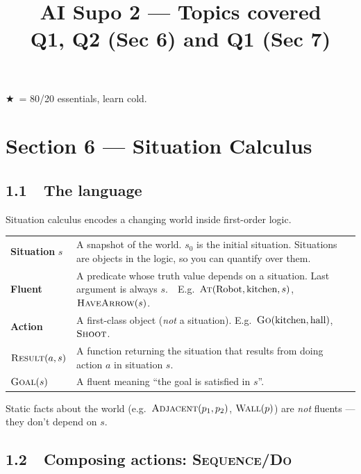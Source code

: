 \documentclass[11pt,a4paper]{article}
\title{\vspace{-1.5cm}AI Supo 2 --- Topics covered\\\large Q1, Q2 (Sec 6) and Q1 (Sec 7)}
\author{}
\date{}
\newcommand{\pred}[1]{\textsc{#1}}
\newcommand{\Result}{\pred{Result}}
\newcommand{\key}{\textbf{\textcolor{keyrule}{\large$\bigstar$}}\ }
\begin{document}
\maketitle
\vspace{-1cm}

\hfill \textbf{\textcolor{keyrule}{$\bigstar$}}\ = 80/20 essentials, learn cold.

\hrulefill

\section*{Section 6 --- Situation Calculus}

\subsection*{1.1\ \ The language}

Situation calculus encodes a changing world inside first-order logic.

\begin{keybox}[\key Core ontology]
\begin{tabular}{@{}p{3.3cm}p{12cm}@{}}
\textbf{Situation} $s$ & A snapshot of the world. $s_0$ is the initial situation. Situations are objects in the logic, so you can quantify over them.\\
\textbf{Fluent} & A predicate whose truth value depends on a situation. Last argument is always $s$.\ \ E.g.\ $\pred{At}(\text{Robot}, \text{kitchen}, s)$, $\pred{HaveArrow}(s)$.\\
\textbf{Action} & A first-class object (\emph{not} a situation). E.g.\ $\pred{Go}(\text{kitchen}, \text{hall})$, $\pred{Shoot}$.\\
\textbf{$\Result(a,s)$} & A function returning the situation that results from doing action $a$ in situation $s$.\\
\textbf{$\pred{Goal}(s)$} & A fluent meaning ``the goal is satisfied in $s$''.\\
\end{tabular}
\end{keybox}

Static facts about the world (e.g.\ $\pred{Adjacent}(p_1,p_2)$, $\pred{Wall}(p)$) are \emph{not} fluents --- they don't depend on $s$.

\subsection*{1.2\ \ Composing actions: \pred{Sequence}/\pred{Do}}
\end{document}
